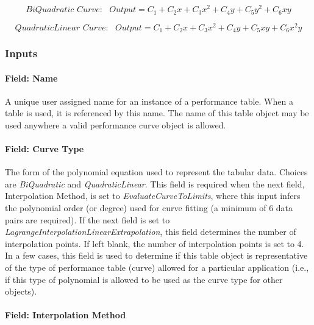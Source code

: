 \begin{equation}
BiQuadratic\,\,Curve:\,\,\,\,Output = {C_1} + {C_2}x + {C_3}{x^2} + {C_4}y + {C_5}{y^2} + {C_6}xy
\end{equation}

\begin{equation}
QuadraticLinear\,\,Curve:\,\,\,\,Output = {C_1} + {C_2}x + {C_3}{x^2} + {C_4}y + {C_5}xy + {C_6}{x^2}y
\end{equation}

\subsubsection{Inputs}\label{inputs-1-029}

\paragraph{Field: Name}\label{field-name-1-028}

A unique user assigned name for an instance of a performance table. When a table is used, it is referenced by this name. The name of this table object may be used anywhere a valid performance curve object is allowed.

\paragraph{Field: Curve Type}\label{field-curve-type-1}

The form of the polynomial equation used to represent the tabular data. Choices are \emph{BiQuadratic} and \emph{QuadraticLinear}. This field is required when the next field, Interpolation Method, is set to \emph{EvaluateCurveToLimits}, where this input infers the polynomial order (or degree) used for curve fitting (a minimum of 6 data pairs are required). If the next field is set to \emph{LagrangeInterpolationLinearExtrapolation}, this field determines the number of interpolation points. If left blank, the number of interpolation points is set to 4. In a few cases, this field is used to determine if this table object is representative of the type of performance table (curve) allowed for a particular application (i.e., if this type of polynomial is allowed to be used as the curve type for other objects).

\paragraph{Field: Interpolation Method}\label{field-interpolation-method-1}

